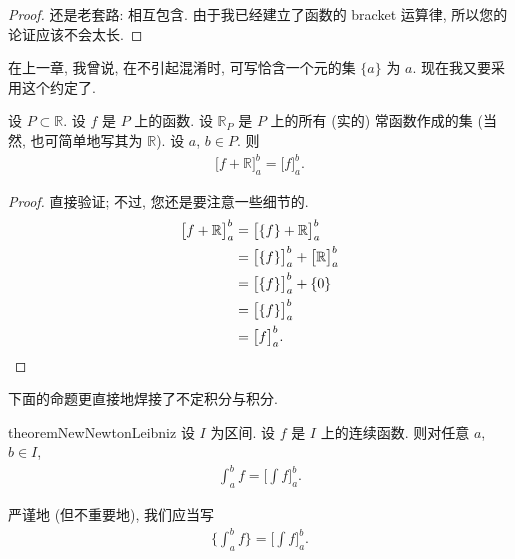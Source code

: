 \begin{proof}
    还是老套路: 相互包含. 由于我已经建立了函数的 bracket 运算律, 所以您的论证应该不会太长.
\end{proof}

在上一章, 我曾说, 在不引起混淆时, 可写恰含一个元的集 $\{ a \}$ 为 $a$. 现在我又要采用这个约定了.

\begin{theorem}
    设 $P \subset \mathbb{R}$. 设 $f$ 是 $P$ 上的函数. 设 $\mathbb{R}_P$ 是 $P$ 上的所有 (实的) 常函数作成的集 (当然, 也可简单地写其为 $\mathbb{R}$). 设 $a$, $b \in P$. 则
    \begin{align*}
        \big[ f + \mathbb{R} \big]_{a}^{b} = \big[ f \big]_{a}^{b}.
    \end{align*}
\end{theorem}

\begin{proof}
    直接验证; 不过, 您还是要注意一些细节的.
    \begin{align*}
        \big[ f + \mathbb{R} \big]_{a}^{b}
        = {} & \big[ \{f\} + \mathbb{R} \big]_{a}^{b}                     \\
        = {} & \big[ \{f\} \big]_{a}^{b} + \big[ \mathbb{R} \big]_{a}^{b} \\
        = {} & \big[ \{f\} \big]_{a}^{b} + \{ 0 \}                        \\
        = {} & \big[ \{f\} \big]_{a}^{b}                                  \\
        = {} & \big[ f \big]_{a}^{b}. \qedhere
    \end{align*}
\end{proof}

下面的命题更直接地焊接了不定积分与积分.

\begin{restatable}{theorem}{NewNewtonLeibniz}
    设 $I$ 为区间. 设 $f$ 是 $I$ 上的连续函数. 则对任意 $a$, $b \in I$,
    \begin{align*}
        \int_{a}^{b} {f} = \Bigg[ \int {f} \Bigg]_{a}^{b}.
    \end{align*}
\end{restatable}

\begin{remark}
    严谨地 (但不重要地), 我们应当写
    \begin{align*}
        \Bigg\{ \int_{a}^{b} {f} \Bigg\} = \Bigg[ \int {f} \Bigg]_{a}^{b}.
    \end{align*}
\end{remark}

